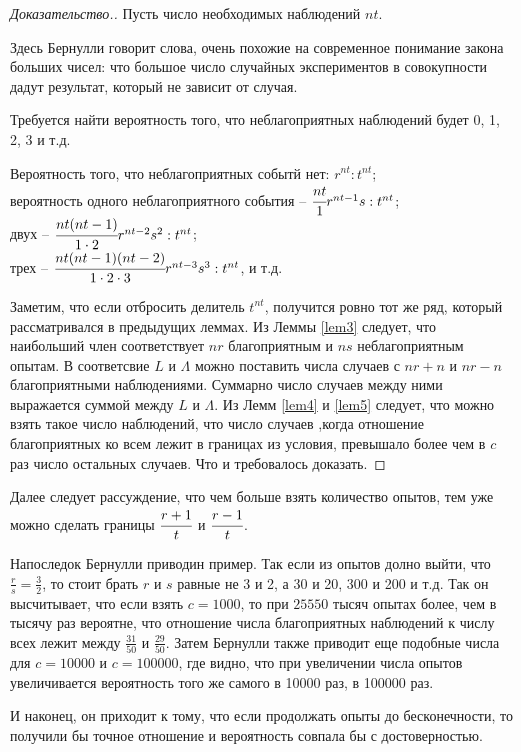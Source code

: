 \documentclass[12pt]{article}
\begin{document}
\begin{proof}[Доказательство.]
Пусть число необходимых наблюдений $nt$.

Здесь Бернулли говорит слова, очень похожие на современное понимание закона больших чисел: что большое число случайных экспериментов в совокупности дадут результат, который не зависит от случая.

Требуется найти вероятность того, что неблагоприятных наблюдений будет 0, 1, 2, 3 и т.д.

Вероятность того, что неблагоприятных событй нет: $r^{nt} : t^{nt}$;\\
вероятность одного неблагоприятного события -- $\cfrac{nt}{1} r^{nt-1} s : t^{nt}$;\\
двух -- $\cfrac{nt(nt-1)}{1 \cdot 2} r^{nt-2} s^2 : t^{nt}$;\\
трех -- $\cfrac{nt(nt-1)(nt-2)}{1 \cdot 2 \cdot 3} r^{nt-3} s^3 : t^{nt}$, и т.д.

Заметим, что если отбросить делитель $t^{nt}$, получится ровно тот же ряд, который рассматривался в предыдущих леммах.
Из Леммы \ref{lem3} следует, что наибольший член соответствует $nr$ благоприятным и $ns$ неблагоприятным опытам.
В соответсвие $L$ и $\Lambda$ можно поставить числа случаев с $nr+n$ и $nr-n$ благоприятными наблюдениями.
Суммарно число случаев между ними выражается суммой между $L$ и $\Lambda$.
Из Лемм \ref{lem4} и \ref{lem5} следует, что можно взять такое число наблюдений, что число случаев ,когда отношение благоприятных ко всем лежит в границах из условия, превышало более чем в  $c$ раз число остальных случаев.
Что и требовалось доказать.
\end{proof}

Далее следует рассуждение, что чем больше взять количество опытов, тем уже можно сделать границы $\cfrac{r+1}{t}$ и $\cfrac{r-1}{t}$.

Напоследок Бернулли приводин пример. 
Так если из опытов долно выйти, что $\frac{r}{s} = \frac{3}{2}$, то стоит брать $r$ и $s$ равные не 3 и 2, а 30 и 20, 300 и 200 и т.д.
Так он высчитывает, что если взять $c=1000$,  то при $25550$ тысяч опытах более, чем в тысячу раз вероятне, что  отношение числа благоприятных наблюдений к числу всех лежит между $\frac{31}{50}$ и $\frac{29}{50}$.
Затем Бернулли также приводит еще подобные числа для $c=10000$ и $c=100000$, где видно, что при увеличении числа опытов увеличивается вероятность того же самого в 10000 раз, в 100000 раз.

И наконец, он приходит к тому, что если продолжать опыты до бесконечности, то получили бы точное отношение и вероятность совпала бы с достоверностью.
\end{document}
